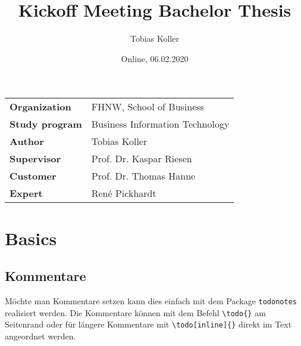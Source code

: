 \documentclass[draft]{fhnwreport}       %
\title{Kickoff Meeting Bachelor Thesis}          %
\author{Tobias Koller}          %
\date{Online, 06.02.2020}             %
\begin{document}
\maketitle

\vspace*{-1cm}						    %
\vfill

{
\renewcommand\arraystretch{2}
\begin{center}
\begin{tabular}{>{\bf}p{4cm} l}
Organization                  &    FHNW, School of Business\\
Study program                 &    Business Information Technology\\
Author   	                  &    Tobias Koller\\
Supervisor                    &    Prof. Dr. Kaspar Riesen\\
Customer                      &    Prof. Dr. Thomas Hanne\\
Expert                        &    René Pickhardt
\end{tabular}
\end{center}
}
\clearpage

\section{Basics}
\subsection{Kommentare}\label{sec:todos}
Möchte man Kommentare setzen kann dies einfach mit dem Package \texttt{todonotes} realisiert werden. Die Kommentare können mit dem Befehl \verb|\todo{}| am Seitenrand oder für längere Kommentare mit \verb|\todo[inline]{}| direkt im Text angeordnet werden. 

{%
}
\end{document}
